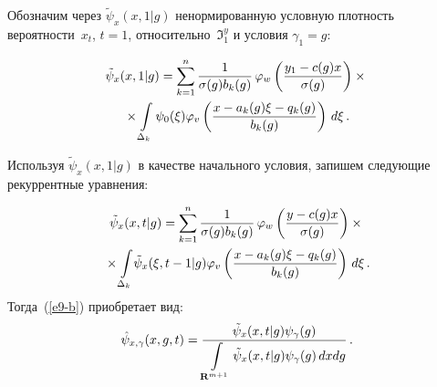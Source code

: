 \begin{multicols}{2}
  Обозначим через $\tilde{\psi}_x (x,1\vert g)$ ненормированную условную плотность 
вероятности~$x_t$, $t=1$, относительно~$\Im^y_1$ и условия $\gamma_1=g$:

\noindent
  \begin{multline*}
  \tilde{\psi}_x(x,1\vert g) =\sum\limits_{k=1}^n \displaystyle\frac{\displaystyle 1\mathstrut}{\displaystyle \sigma(g) b_k(g)\mathstrut}\,\varphi_w \left( 
\displaystyle\frac{\displaystyle y_1-c(g)x\mathstrut}{\displaystyle \sigma(g)\mathstrut}\right)\times{}\\
{}\times \int\limits_{\Delta_k} \psi_0(\xi) \varphi_v \left( \displaystyle\frac{\displaystyle x-a_k(g)\xi -
q_k(g)\mathstrut}{\displaystyle b_k(g)\mathstrut}\right) \,d\xi\,.
  \end{multline*}
  
  Используя $\tilde{\psi}_x(x,1\vert g)$ в качестве начального условия, запишем следующие 
рекуррентные уравнения:

\noindent
  \begin{multline}
  \tilde{\psi}_x(x,t\vert g)=\sum\limits_{k=1}^n \displaystyle\frac{\displaystyle 1\mathstrut}{\displaystyle \sigma(g) b_k(g)\mathstrut}\,\varphi_w \left( \displaystyle\frac{\displaystyle y-
c(g)x\mathstrut}{\displaystyle \sigma(g)\mathstrut}\right)\times{}\\
\!\!\!{}\times  \int\limits_{\Delta_k}\! \tilde{\psi}_x(\xi,t-1\vert g) \varphi_v \left( 
  \displaystyle\frac{\displaystyle x-a_k(g)\xi-q_k(g)\mathstrut}{\displaystyle b_k(g)\mathstrut}\right)\,d\xi\,.
  \label{e11-b}\!\!\!
  \end{multline}
  Тогда~(\ref{e9-b}) приобретает вид:
  \begin{equation}
  \hat{\psi}_{x,\gamma}(x,g,t) =\displaystyle\frac{\displaystyle \tilde{\psi}_x(x,t\vert 
g)\psi_\gamma(g)\mathstrut}{\displaystyle \int\limits_{\mathbf{R}^{m+1}}\tilde{\psi}_x(x,t\vert g)\psi_\gamma(g)\,dx 
dg\mathstrut}\,.
  \label{e12-b}
  \end{equation}
  
  \begin{figure*}[b] %
\vspace*{1pt}
\begin{minipage}[t]{80mm}
\begin{center}
\mbox{%
\epsfxsize=76.888mm
}
\end{center}
\vspace*{-9pt}
\end{minipage}
\hfill    
\vspace*{1pt}
\begin{minipage}[t]{80mm}
\begin{center}
\mbox{%
\epsfxsize=76.625mm
}
\end{center}
\vspace*{-9pt}
\end{minipage}
\end{figure*}
  

\end{multicols}

